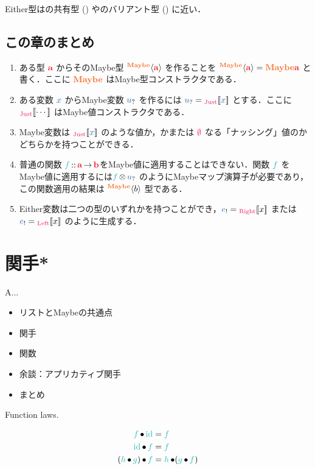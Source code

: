 \documentclass[a5paper,twoside,fleqn,draft]{jsbook}
\begin{document}
Either型は\clang の共有型 () や\cxx のバリアント型 () に近い．

\section{この章のまとめ}

\begin{enumerate}
\item ある型 $\hTypeName{a}$ からそのMaybe型 $\hMaybeConstruct{\hTypeName{a}}$ を作ることを $\hMaybeConstruct{\hTypeName{a}}=\hMaybe\hTypeName{a} $ と書く．ここに $\hMaybe$ はMaybe型コンストラクタである．
\item ある変数 $\hVar{x}$ からMaybe変数 $\hMaybeVar{u}$ を作るには $\hMaybeVar{u}=\hJustWith{\hVar{x}}$ とする．ここに $\hJustWith{\dotsb}$ はMaybe値コンストラクタである．
\item Maybe変数は $\hJustWith{\hVar{x}}$ のような値か，かまたは $\hNothing$ なる「ナッシング」値のかどちらかを持つことができる．
\item 普通の関数 $\hFunc{f}\hIsTypeOf\mProjEXP{\hTypeName{a} }{\hTypeName{b} }$をMaybe値に適用することはできない．関数 $\hFunc{f}$ をMaybe値に適用するには$\hFunc{f}\hFunctorMap\hMaybeVar{u}$ のようにMaybeマップ演算子が必要であり，この関数適用の結果は $\hMaybeConstruct{b}$ 型である．
\item Either変数は二つの型のいずれかを持つことができ，$\hEitherVar{e}=\hRightWith{x}$ または$\hEitherVar{e}=\hLeftWith{x}$ のように生成する．
\end{enumerate}

\chapter{関手*}
\label{ch:functor}

\begin{leader}
A...
\end{leader}

\begin{itemize}
  \item リストとMaybeの共通点
  \item 関手
  \item 関数
  \item 余談：アプリカティブ関手
  \item まとめ
\end{itemize}

Function laws.

\begin{align}
\hFunc{f}\hCompose\hId&=\hFunc{f}\\
\hId\hCompose\hFunc{f}&=\hFunc{f}\\
(\hFunc{h}\hCompose\hFunc{g})\hCompose\hFunc{f}&=\hFunc{h}\hCompose(\hFunc{g}\hCompose\hFunc{f})
\end{align}
\end{document}
